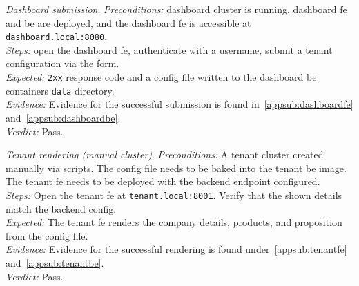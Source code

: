 \documentclass[11pt, a4paper, oneside, listof=totoc]{scrartcl}
\begin{document}
            \begin{enumerate}[label={[\arabic*]:},
                    ref=Challenge~\arabic*,
                    leftmargin=*,
                    itemsep=0.6\baselineskip]

                    \item\label{chal:dashboardSubmission}
                        \textit{Dashboard submission}.
                        \emph{Preconditions:} dashboard cluster is running, dashboard \gls{fe} and
                        \gls{be} are deployed, and the dashboard \gls{fe} is accessible at
                        \texttt{dashboard.local:8080}.\\
                        \emph{Steps:} open the dashboard \gls{fe}, authenticate with a username,
                        submit a tenant configuration via the form.\\
                        \emph{Expected:} \texttt{2xx} response code and a config file written to
                        the dashboard \gls{be} containers \texttt{data} directory.\\
                        \emph{Evidence:} Evidence for the successful submission is found
                        in~\autoref{appsub:dashboardfe} and~\autoref{appsub:dashboardbe}.\\
                        \emph{Verdict:} Pass.

                    \item\label{chal:tenantRendering}
                        \textit{Tenant rendering (manual cluster)}.
                        \emph{Preconditions:} A tenant cluster created manually via scripts.
                        The config file needs to be baked into the tenant \gls{be} image.
                        The tenant \gls{fe} needs to be deployed with the backend endpoint
                        configured.\\
                        \emph{Steps:} Open the tenant \gls{fe} at \texttt{tenant.local:8001}.
                        Verify that the shown details match the backend config.\\
                        \emph{Expected:} The tenant \gls{fe} renders the company details, products,
                        and proposition from the config file.\\
                        \emph{Evidence:} Evidence for the successful rendering is found
                        under~\autoref{appsub:tenantfe} and~\autoref{appsub:tenantbe}.\\
                        \emph{Verdict:} Pass.


\end{enumerate}
\end{document}
